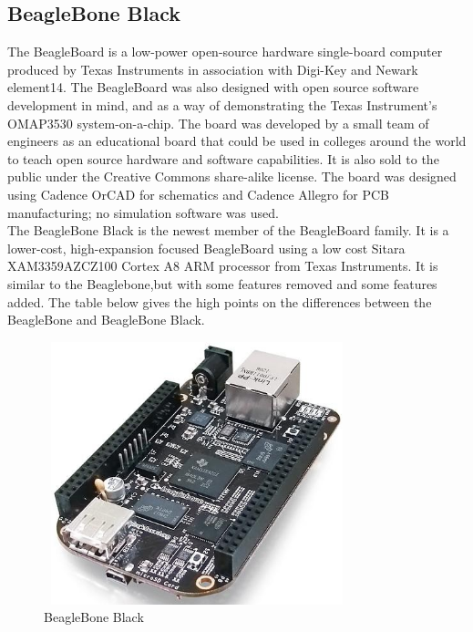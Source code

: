 \subsection{BeagleBone Black}
The BeagleBoard is a low-power open-source hardware single-board computer produced by Texas Instruments in association with Digi-Key and Newark element14. The BeagleBoard was also designed with open source software development in mind, and as a way of demonstrating the Texas Instrument's OMAP3530 system-on-a-chip. The board was developed by a small team of engineers as an educational board that could be used in colleges around the world to teach open source hardware and software capabilities. It is also sold to the public under the Creative Commons share-alike license. The board was designed using Cadence OrCAD for schematics and Cadence Allegro for PCB manufacturing; no simulation software was used.\\
The BeagleBone Black is the newest member of the BeagleBoard family. It is a lower-cost, high-expansion focused BeagleBoard using a low cost Sitara XAM3359AZCZ100 Cortex A8 ARM processor from Texas Instruments. It is similar to the Beaglebone,but with some features removed and some features added. The table below gives the high points on the differences between the BeagleBone and BeagleBone Black.
\begin{figure}[ht]
	\centering
	\includegraphics[width=3.5in, height=3in]{images/beaglebone_black.png}
	\caption{BeagleBone Black}
\end{figure}
